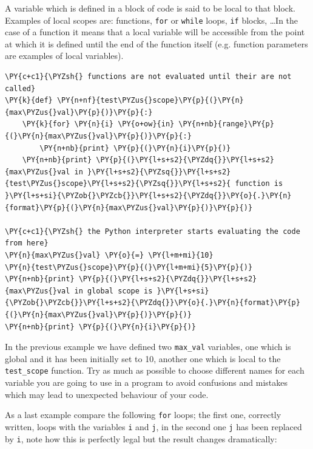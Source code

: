 A variable which is defined in a block of code is said to be local to that block. Examples of local scopes are: functions, \texttt{for} or \texttt{while} loops, \texttt{if} blocks, \ldots In the case of a function it means that a local variable will be accessible from the point at which it is defined until the end of the function itself (e.g. function parameters are examples of local variables).

\begin{tcolorbox}[breakable, size=fbox, boxrule=1pt, pad at break*=1mm,colback=cellbackground, colframe=cellborder]
\begin{Verbatim}[commandchars=\\\{\}]
\PY{c+c1}{\PYZsh{} functions are not evaluated until their are not called}
\PY{k}{def} \PY{n+nf}{test\PYZus{}scope}\PY{p}{(}\PY{n}{max\PYZus{}val}\PY{p}{)}\PY{p}{:}
    \PY{k}{for} \PY{n}{i} \PY{o+ow}{in} \PY{n+nb}{range}\PY{p}{(}\PY{n}{max\PYZus{}val}\PY{p}{)}\PY{p}{:}
        \PY{n+nb}{print} \PY{p}{(}\PY{n}{i}\PY{p}{)}
    \PY{n+nb}{print} \PY{p}{(}\PY{l+s+s2}{\PYZdq{}}\PY{l+s+s2}{max\PYZus{}val in }\PY{l+s+s2}{\PYZsq{}}\PY{l+s+s2}{test\PYZus{}scope}\PY{l+s+s2}{\PYZsq{}}\PY{l+s+s2}{ function is }\PY{l+s+si}{\PYZob{}\PYZcb{}}\PY{l+s+s2}{\PYZdq{}}\PY{o}{.}\PY{n}{format}\PY{p}{(}\PY{n}{max\PYZus{}val}\PY{p}{)}\PY{p}{)}
    
\PY{c+c1}{\PYZsh{} the Python interpreter starts evaluating the code from here}
\PY{n}{max\PYZus{}val} \PY{o}{=} \PY{l+m+mi}{10}
\PY{n}{test\PYZus{}scope}\PY{p}{(}\PY{l+m+mi}{5}\PY{p}{)}
\PY{n+nb}{print} \PY{p}{(}\PY{l+s+s2}{\PYZdq{}}\PY{l+s+s2}{max\PYZus{}val in global scope is }\PY{l+s+si}{\PYZob{}\PYZcb{}}\PY{l+s+s2}{\PYZdq{}}\PY{o}{.}\PY{n}{format}\PY{p}{(}\PY{n}{max\PYZus{}val}\PY{p}{)}\PY{p}{)}
\PY{n+nb}{print} \PY{p}{(}\PY{n}{i}\PY{p}{)}
\end{Verbatim}
\end{tcolorbox}

In the previous example we have defined two \texttt{max\_val} variables, one which is global and it has been initially set to 10, another one which is local to the \texttt{test\_scope} function.
Try as much as possible to choose different names for each variable you are going to use in a program to avoid confusions and mistakes which may lead to unexpected behaviour of your code.

As a last example compare the following \texttt{for} loops; the first one, correctly written, loops with the variables \texttt{i} and \texttt{j}, in the second one \texttt{j} has been replaced by \texttt{i}, note how this is perfectly legal but the result changes dramatically:

